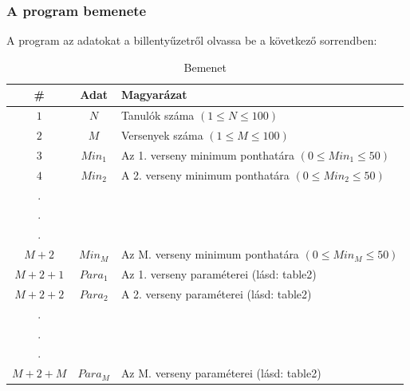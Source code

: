 \documentclass[a4paper]{article}
\begin{document}
      \subsubsection{A program bemenete}
        A program az adatokat a billentyűzetről olvassa be a következő sorrendben:
        \begin{table}[H]
          \centering
          \caption{Bemenet}
          \label{tab:table1}
          \begin{tabular}{ccl}
            \toprule
            \# & Adat & Magyarázat \\
            \midrule
            $1$ & $N$ & Tanulók száma $(1 \leqslant N \leqslant 100)$ \\
            $2$ & $M$ & Versenyek száma $(1 \leqslant M \leqslant 100)$ \\
            $3$ & $Min_1$ & Az 1. verseny minimum ponthatára $(0 \leqslant Min_1 \leqslant 50)$ \\
            $4$ & $Min_2$ & A 2. verseny minimum ponthatára $(0 \leqslant Min_2 \leqslant 50)$ \\
            . \\
            . \\
            . \\
            $M+2$ & $Min_M$ & Az M. verseny minimum ponthatára $(0 \leqslant Min_M \leqslant 50)$ \\
            $M+2+1$ & $Para_1$ & Az 1. verseny paraméterei (lásd: table2) \\
            $M+2+2$ & $Para_2$ & A 2. verseny paraméterei (lásd: table2) \\
            . \\
            . \\
            . \\
            $M+2+M$ & $Para_M$ & Az M. verseny paraméterei (lásd: table2) \\
            \bottomrule
          \end{tabular}
        \end{table}
\end{document}
